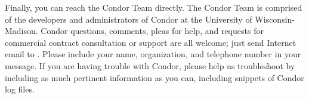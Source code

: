 Finally, you can reach the Condor Team directly.  The Condor Team is comprised of the 
developers and administrators of Condor at the University of Wisconsin-Madison. Condor 
questions, comments, pleas for help, and requests for commercial contract consultation or support 
are all welcome; just send Internet email to .  Please include your 
name, organization, and telephone number in your message.  If you are having trouble with 
Condor, please help us troubleshoot by including as much pertinent information as you can, 
including snippets of Condor log files. 


